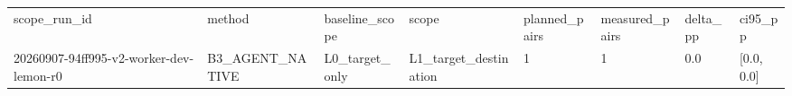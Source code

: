 \begin{tabular}{llllllll}
scope\_run\_id & method & baseline\_scope & scope & planned\_pairs & measured\_pairs & delta\_pp & ci95\_pp \\
20260907-94ff995-v2-worker-dev-lemon-r0 & B3\_AGENT\_NATIVE & L0\_target\_only & L1\_target\_destination & 1 & 1 & 0.0 & [0.0, 0.0] \\
\end{tabular}

